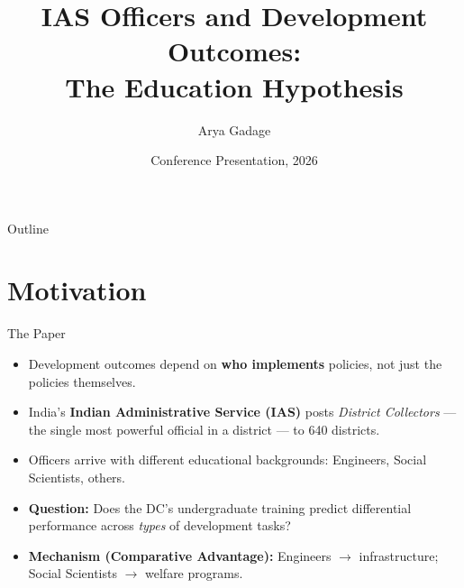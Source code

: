 \documentclass[aspectratio=169,10pt]{beamer}
\title[IAS Education \& Development]{%
  \textbf{IAS Officers and Development Outcomes:}\\
  The Education Hypothesis}
\author{Arya Gadage}
\institute{Columbia University}
\date{Conference Presentation, 2026}
\begin{document}

\begin{frame}
  \titlepage
\end{frame}

\begin{frame}{Outline}
  \tableofcontents[hideallsubsections]
\end{frame}

\section{Motivation}

\begin{frame}{The Paper}
  \begin{itemize}\setlength\itemsep{8pt}
    \item Development outcomes depend on \textbf{who implements} policies,
          not just the policies themselves.
    \item India's \textbf{Indian Administrative Service (IAS)} posts \emph{District Collectors}
          — the single most powerful official in a district — to 640 districts.
    \item Officers arrive with different educational backgrounds:
          Engineers, Social Scientists, others.
    \item \textbf{Question:} Does the DC's undergraduate training predict
          differential performance across \emph{types} of development tasks?
    \item \textbf{Mechanism (Comparative Advantage):}
          Engineers $\to$ infrastructure; Social Scientists $\to$ welfare programs.
  \end{itemize}
\end{frame}
\end{document}

